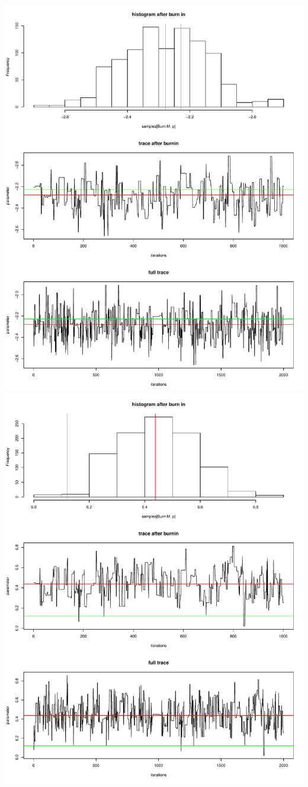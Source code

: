 \documentclass[a4paper,12pt]{scrartcl} %
\begin{document}
\clearpage
\includegraphics[scale=0.4]{13}  %
\includegraphics[scale=0.4]{14}
\end{document}
